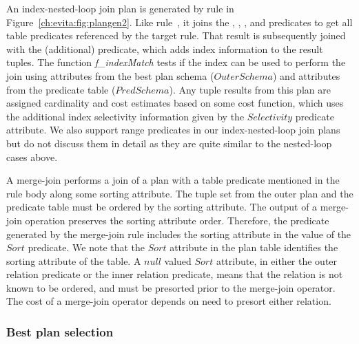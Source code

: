 An index-nested-loop join plan is generated by rule  in
Figure~\ref{ch:evita:fig:plangen2}.  Like rule~, it joins the
, , , and  predicates to
get all table predicates referenced by the target rule.  That result is
subsequently joined with the (additional)  predicate, which adds
index information to the result tuples.  The function {\em f\_indexMatch} tests
if the index can be used to perform the join using attributes from the best
plan schema ($OuterSchema$) and attributes from the predicate table
($PredSchema$).  Any tuple results from this plan are assigned cardinality and
cost estimates based on some cost function, which uses the additional index
selectivity information given by the $Selectivity$  predicate
attribute.  We also support range predicates in our index-nested-loop join
plans but do not discuss them in detail as they are quite similar to the
nested-loop cases above.

A merge-join performs a join of a plan with a table predicate mentioned in the
rule body along some sorting attribute.  The tuple set from the outer plan and
the predicate table must be ordered by the sorting attribute.  The output of a
merge-join operation preserves the sorting attribute order.  Therefore, the
 predicate generated by the merge-join rule includes the sorting
attribute in the value of the $Sort$  predicate.  We note that the
$Sort$ attribute in the  plan table identifies the sorting attribute
of the table.  A $null$ valued $Sort$ attribute, in either the outer relation
 predicate or the inner relation  predicate, means that the
relation is not known to be ordered, and must be presorted prior to the
merge-join operator.  The cost of a merge-join operator depends on need to
presort either relation.

\subsubsection{Best plan selection}
\label{ch:evita:sec:bestplan}

